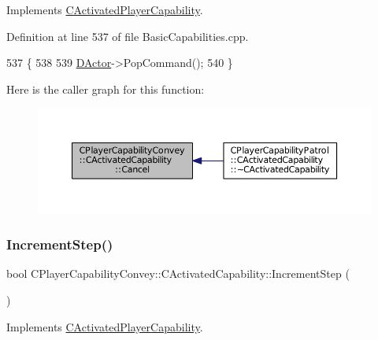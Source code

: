 Implements \hyperlink{classCActivatedPlayerCapability_a5cde83be468e262ad054d81e28684a81}{C\+Activated\+Player\+Capability}.



Definition at line 537 of file Basic\+Capabilities.\+cpp.


\begin{DoxyCode}
537                                                         \{
538 
539     \hyperlink{classCActivatedPlayerCapability_a54ca944b47bff2718330639941d402b0}{DActor}->PopCommand();
540 \}
\end{DoxyCode}
Here is the caller graph for this function\+:\nopagebreak
\begin{figure}[H]
\begin{center}
\leavevmode
\includegraphics[width=350pt]{classCPlayerCapabilityConvey_1_1CActivatedCapability_ad84a94a1ae3647ea160e262a0154e229_icgraph}
\end{center}
\end{figure}
\hypertarget{classCPlayerCapabilityConvey_1_1CActivatedCapability_ac1bf251eca552885041b1bcefa594591}{}\label{classCPlayerCapabilityConvey_1_1CActivatedCapability_ac1bf251eca552885041b1bcefa594591} 
\subsubsection{\texorpdfstring{Increment\+Step()}{IncrementStep()}}
{\footnotesize\ttfamily bool C\+Player\+Capability\+Convey\+::\+C\+Activated\+Capability\+::\+Increment\+Step (\begin{DoxyParamCaption}{ }\end{DoxyParamCaption})\hspace{0.3cm}{\ttfamily [virtual]}}



Implements \hyperlink{classCActivatedPlayerCapability_a943b5999a57504399293250382c0ec6a}{C\+Activated\+Player\+Capability}.



